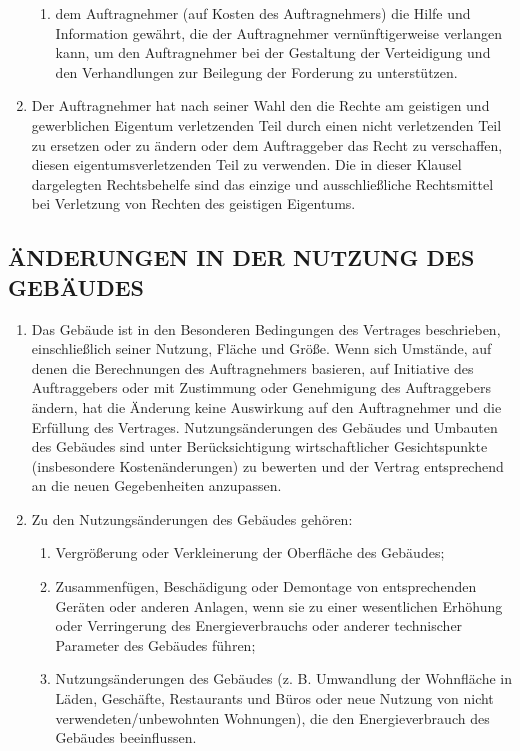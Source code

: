 \begin{multicols}{2}
\begin{enumerate}
\begin{enumerate}
   \item dem Auftragnehmer (auf Kosten des Auftragnehmers) die Hilfe und Information gewährt, die der Auftragnehmer vernünftigerweise verlangen kann, um den Auftragnehmer bei der Gestaltung der Verteidigung und den Verhandlungen zur Beilegung der Forderung zu unterstützen.
   \end{enumerate}
   \item Der Auftragnehmer hat nach seiner Wahl den die Rechte am geistigen und gewerblichen Eigentum verletzenden Teil durch einen nicht verletzenden Teil zu ersetzen oder zu ändern oder dem Auftraggeber das Recht zu verschaffen, diesen eigentumsverletzenden Teil zu verwenden. Die in dieser Klausel dargelegten Rechtsbehelfe sind das einzige und ausschließliche Rechtsmittel bei Verletzung von Rechten des geistigen Eigentums.
   \end{enumerate}

   \subsection{ÄNDERUNGEN IN DER NUTZUNG DES GEBÄUDES}
   \begin{enumerate}
   \item Das Gebäude ist in den Besonderen Bedingungen des Vertrages beschrieben, einschließlich seiner Nutzung, Fläche und Größe. Wenn sich Umstände, auf denen die Berechnungen des Auftragnehmers basieren, auf Initiative des Auftraggebers oder mit Zustimmung oder Genehmigung des Auftraggebers ändern, hat die Änderung keine Auswirkung auf den Auftragnehmer und die Erfüllung des Vertrages. Nutzungsänderungen des Gebäudes und Umbauten des Gebäudes sind unter Berücksichtigung wirtschaftlicher Gesichtspunkte (insbesondere Kostenänderungen) zu bewerten und der Vertrag entsprechend an die neuen Gegebenheiten anzupassen.
   \item Zu den Nutzungsänderungen des Gebäudes gehören:
   \begin{enumerate}
   \item Vergrößerung oder Verkleinerung der Oberfläche des Gebäudes;
   \item Zusammenfügen, Beschädigung oder Demontage von entsprechenden Geräten oder anderen Anlagen, wenn sie zu einer wesentlichen Erhöhung oder Verringerung des Energieverbrauchs oder anderer technischer Parameter des Gebäudes führen;
   \item Nutzungsänderungen des Gebäudes (z. B. Umwandlung der Wohnfläche in Läden, Geschäfte, Restaurants und Büros oder neue Nutzung von nicht verwendeten/unbewohnten Wohnungen), die den Energieverbrauch des Gebäudes beeinflussen.
   \end{enumerate}
   \end{enumerate}


\end{multicols}
